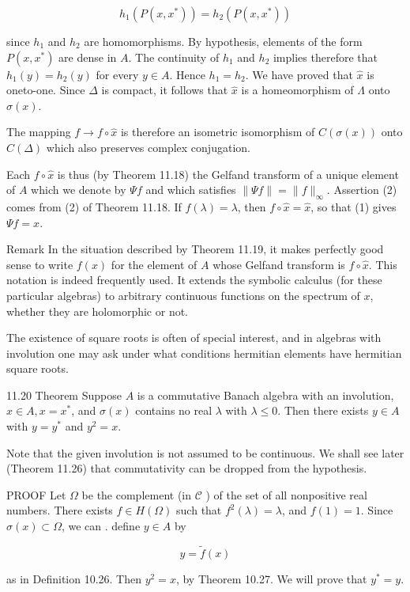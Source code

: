 \documentclass[10pt]{article}
\begin{document}
$$
h_{1}\left(P\left(x, x^{*}\right)\right)=h_{2}\left(P\left(x, x^{*}\right)\right)
$$

since $h_{1}$ and $h_{2}$ are homomorphisms. By hypothesis, elements of the form $P\left(x, x^{*}\right)$ are dense in $A$. The continuity of $h_{1}$ and $h_{2}$ implies therefore that $h_{1}(y)=h_{2}(y)$ for every $y \in A$. Hence $h_{1}=h_{2}$. We have proved that $\hat{x}$ is oneto-one. Since $\Delta$ is compact, it follows that $\hat{x}$ is a homeomorphism of $\Lambda$ onto $\sigma(x)$.

The mapping $f \rightarrow f \circ \hat{x}$ is therefore an isometric isomorphism of $C(\sigma(x))$ onto $C(\Delta)$ which also preserves complex conjugation.

Each $f \circ \hat{x}$ is thus (by Theorem 11.18) the Gelfand transform of a unique element of $A$ which we denote by $\Psi f$ and which satisfies $\|\Psi f\|=\|f\|_{\infty}$. Assertion (2) comes from (2) of Theorem 11.18. If $f(\lambda)=\lambda$, then $f \circ \hat{x}=\hat{x}$, so that (1) gives $\Psi f=x$.

Remark In the situation described by Theorem 11.19, it makes perfectly good sense to write $f(x)$ for the element of $A$ whose Gelfand transform is $f \circ \hat{x}$. This notation is indeed frequently used. It extends the symbolic calculus (for these particular algebras) to arbitrary continuous functions on the spectrum of $x$, whether they are holomorphic or not.

The existence of square roots is often of special interest, and in algebras with involution one may ask under what conditions hermitian elements have hermitian square roots.

11.20 Theorem Suppose $A$ is a commutative Banach algebra with an involution, $x \in A, x=x^{*}$, and $\sigma(x)$ contains no real $\lambda$ with $\lambda \leq 0$. Then there exists $y \in A$ with $y=y^{*}$ and $y^{2}=x$.

Note that the given involution is not assumed to be continuous. We shall see later (Theorem 11.26) that commutativity can be dropped from the hypothesis.

PROOF Let $\Omega$ be the complement (in $\mathscr{C}$ ) of the set of all nonpositive real numbers. There exists $f \in H(\Omega)$ such that $f^{2}(\lambda)=\lambda$, and $f(1)=1$. Since $\sigma(x) \subset \Omega$, we can . define $y \in A$ by

$$
y=\tilde{f}(x)
$$

as in Definition 10.26. Then $y^{2}=x$, by Theorem 10.27. We will prove that $y^{*}=y$.
\end{document}
